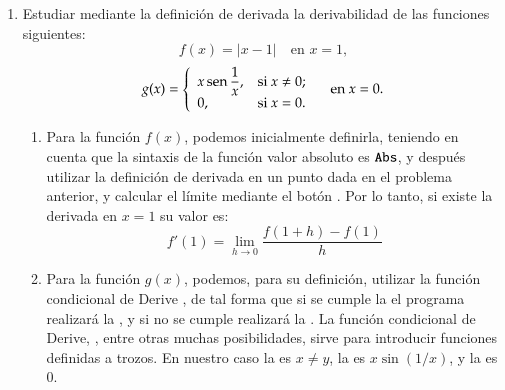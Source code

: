 \begin{enumerate}[leftmargin=*]
% 


\item Estudiar mediante la definición de derivada la derivabilidad de las funciones siguientes:
\[
f(x)=|x-1| \quad \textrm{en $x=1$,}
\]
\[
g(x)=\left\{
\begin{array}{ll}
x \operatorname{sen}\dfrac{1}{x}, & \hbox{si $x\neq 0$;} \\
0, & \hbox{si $x=0$.} \\
\end{array}
\right. \quad \textrm{en $x=0$.}
\]

\begin{indicacion}
\begin{enumerate}
\item Para la función $f(x)$, podemos inicialmente definirla, teniendo en cuenta que la sintaxis de la función valor absoluto es
$\texttt{Abs}$, y después utilizar la definición de derivada en un punto dada en el problema anterior, y calcular el límite mediante el
botón . Por lo tanto, si existe la derivada en $x=1$ su valor es:
\[
f'(1) = \mathop {\lim }\limits_{h \to 0} \frac{{f(1 + h) - f(1)}}
{h}
\]
\item Para la función $g(x)$, podemos, para su definición, utilizar la función condicional de Derive , de tal forma que si se cumple la  el programa realizará la , y si no se cumple realizará la
. La función condicional de Derive, , entre otras muchas posibilidades, sirve para introducir funciones
definidas a trozos. En nuestro caso la  es $x\neq y$, la  es $x\sin(1/x)$, y la  es
$0$.


\end{enumerate}
\end{indicacion}
\end{enumerate}
